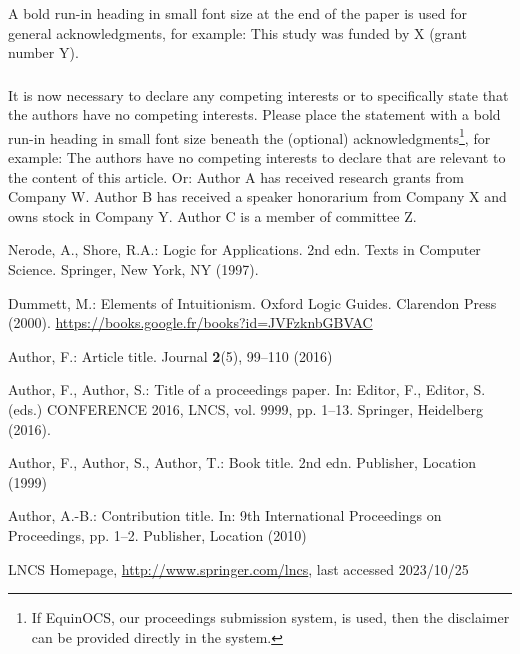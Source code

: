 \documentclass[runningheads]{llncs}
\begin{document}
\begin{credits}
\subsubsection{\ackname} A bold run-in heading in small font size at the end of the paper is
used for general acknowledgments, for example: This study was funded
by X (grant number Y).

\subsubsection{\discintname}
It is now necessary to declare any competing interests or to specifically
state that the authors have no competing interests. Please place the
statement with a bold run-in heading in small font size beneath the
(optional) acknowledgments\footnote{If EquinOCS, our proceedings submission
system, is used, then the disclaimer can be provided directly in the system.},
for example: The authors have no competing interests to declare that are
relevant to the content of this article. Or: Author A has received research
grants from Company W. Author B has received a speaker honorarium from
Company X and owns stock in Company Y. Author C is a member of committee Z.
\end{credits}
%
%
%
% 
% 
%
\begin{thebibliography}{8}

    Nerode, A., Shore, R.A.: Logic for Applications. 2nd edn. Texts in Computer Science. Springer, New York, NY (1997). 
    
    Dummett, M.: Elements of Intuitionism. Oxford Logic Guides. Clarendon Press (2000). \url{https://books.google.fr/books?id=JVFzknbGBVAC}
    

Author, F.: Article title. Journal \textbf{2}(5), 99--110 (2016)

Author, F., Author, S.: Title of a proceedings paper. In: Editor,
F., Editor, S. (eds.) CONFERENCE 2016, LNCS, vol. 9999, pp. 1--13.
Springer, Heidelberg (2016). 

Author, F., Author, S., Author, T.: Book title. 2nd edn. Publisher,
Location (1999)

Author, A.-B.: Contribution title. In: 9th International Proceedings
on Proceedings, pp. 1--2. Publisher, Location (2010)


LNCS Homepage, \url{http://www.springer.com/lncs}, last accessed 2023/10/25
\end{thebibliography}
\end{document}
